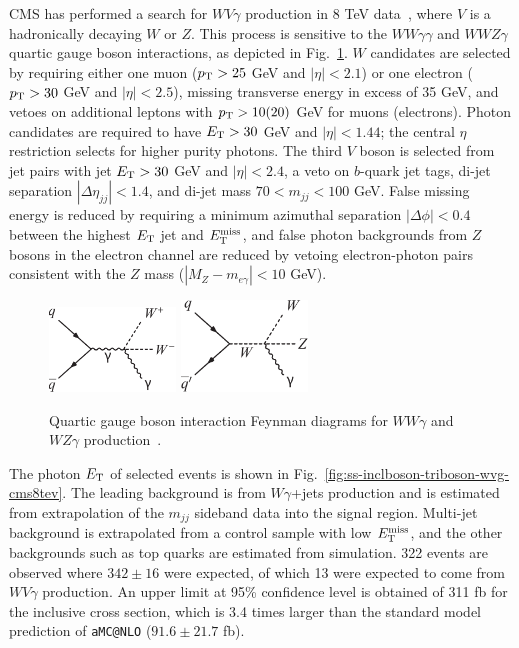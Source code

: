CMS has performed a search for $WV\gamma$ production in 8 TeV
data~\cite{Chatrchyan:2014bza}, where $V$ is a hadronically decaying
$W$ or $Z$.  This process is sensitive to the $WW\gamma\gamma$ and
$WWZ\gamma$ quartic gauge boson interactions, as depicted in
Fig.~\ref{fig:ss-inclboson-triboson-wvg-diagrams}.  $W$ candidates are
selected by requiring either one muon ($p_{\mathrm{T}} > 25$ GeV and
$|\eta|<2.1$) or one electron ($p_{\mathrm{T}} > 30$ GeV and $|\eta| < 2.5$),
missing transverse energy in excess of 35 GeV, and vetoes on
additional leptons with $p_{\mathrm{T}} > 10 (20)$ GeV for muons (electrons).
Photon candidates are required to have $E_{\mathrm{T}} > 30$ GeV and $|\eta| <
1.44$; the central $\eta$ restriction selects for higher purity
photons.  The third $V$ boson is selected from jet pairs with jet $E_{\mathrm{T}}
> 30$ GeV and $|\eta| < 2.4$, a veto on $b$-quark jet tags, di-jet
separation $|\Delta\eta_{jj}| < 1.4$, and di-jet mass $70 < m_{jj} <
100$ GeV.  False missing energy is reduced by requiring a minimum
azimuthal separation $|\Delta\phi| < 0.4$ between the highest $E_{\mathrm{T}}$
jet and $E_{\mathrm{T}}^{\mathrm{miss}}$, and false photon backgrounds from $Z$ bosons in the
electron channel are reduced by vetoing electron-photon pairs
consistent with the $Z$ mass ($|M_Z-m_{e\gamma}| < 10$ GeV).

\begin{figure}[p]
    \centering
    \includegraphics[width=0.3\textwidth]{figures/ss-inclboson-triboson-wvg-diagram1.pdf}
    \includegraphics[width=0.3\textwidth]{figures/ss-inclboson-triboson-wvg-diagram2.pdf}
    \caption{Quartic gauge boson interaction Feynman diagrams for $WW\gamma$ and $WZ\gamma$ production~\cite{Chatrchyan:2014bza}.}
    \label{fig:ss-inclboson-triboson-wvg-diagrams}
\end{figure}


The photon $E_{\mathrm{T}}$ of selected events is shown in
Fig.~\ref{fig:ss-inclboson-triboson-wvg-cms8tev}.  The leading
background is from $W\gamma$+jets production and is estimated from
extrapolation of the $m_{jj}$ sideband data into the signal region.
Multi-jet background is extrapolated from a control sample with low
$E_{\mathrm{T}}^{\mathrm{miss}}$, and the other backgrounds such as top quarks are estimated
from simulation.  322 events are observed where $342\pm 16$ were
expected, of which 13 were expected to come from $WV\gamma$
production.  An upper limit at 95\% confidence level is obtained of
311 fb for the inclusive cross section, which is 3.4 times larger than
the standard model prediction of \texttt{aMC@NLO} ($91.6 \pm 21.7$ fb).

